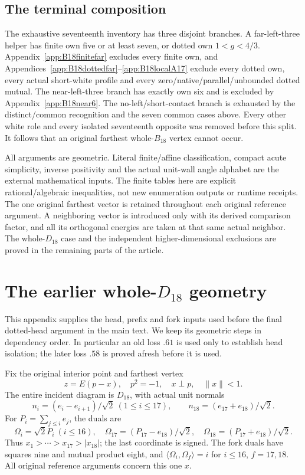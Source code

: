 \documentclass[11pt]{article}
\theoremstyle{definition}
\theoremstyle{remark}
\newcommand{\ip}[2]{\langle #1,#2\rangle}
\newcommand{\norm}[1]{\lVert #1\rVert}
\begin{document}
\subsection{The terminal composition}
\label{app:B18conclusion}
The exhaustive seventeenth inventory has three disjoint branches.
A far-left-three helper has finite own five or at least seven,
or dotted own \(1<g<4/3\).
Appendix~\ref{app:B18finitefar} excludes every finite own, and
Appendices~\ref{app:B18dottedfar}--\ref{app:B18localA17}
exclude every dotted own, every actual short-white profile
and every zero/native/parallel/unbounded dotted mutual.
The near-left-three branch has exactly own six and is excluded
by Appendix~\ref{app:B18near6}.
The no-left/short-contact branch is exhausted by the distinct/common
recognition and the seven common cases above.
Every other white role and every isolated seventeenth opposite
was removed before this split.
It follows that an original farthest whole-\(B_{18}\) vertex
cannot occur.

All arguments are geometric. Literal finite/affine classification,
compact acute simplicity, inverse positivity and the actual unit-wall
angle alphabet are the external mathematical inputs.
The finite tables here are explicit rational/algebraic inequalities,
not new enumeration outputs or runtime receipts.
The one original farthest vector is retained throughout each original
reference argument. A neighboring vector is introduced only with its
derived comparison factor, and all its orthogonal energies are taken
at that same actual neighbor.
The whole-\(D_{18}\) case and the independent higher-dimensional
exclusions are proved in the remaining parts of the article.






\section[The earlier whole-D18 geometry]{The earlier whole-\(D_{18}\) geometry}
\label{app:D18foundation}
This appendix supplies the head, prefix and fork inputs used before
the final dotted-head argument in the main text. We keep its geometric
steps in dependency order. In particular an old loss \(.61\) is used
only to establish head isolation; the later loss \(.58\) is proved
afresh before it is used.

Fix the original interior point and farthest vertex
\[
 z=E(p-x),\quad p^2=-1,\quad x\perp p,\quad \norm x<1.
\]
The entire incident diagram is \(D_{18}\), with actual unit normals
\[
 n_i=(e_i-e_{i+1})/\sqrt2\ (1\leq i\leq17),\qquad
 n_{18}=(e_{17}+e_{18})/\sqrt2 .
\]
For \(P_i=\sum_{j\leq i}e_j\), the duals are
\[
 \Omega_i=\sqrt2P_i\ (i\leq16),\quad
 \Omega_{17}=(P_{17}-e_{18})/\sqrt2,\quad
 \Omega_{18}=(P_{17}+e_{18})/\sqrt2.
\]
Thus \(x_1>\cdots>x_{17}>|x_{18}|\); the last coordinate is signed.
The fork duals have squares nine and mutual product eight, and
\(\ip{\Omega_i}{\Omega_f}=i\) for \(i\leq16\), \(f=17,18\).
All original reference arguments concern this one \(x\).
\end{document}
